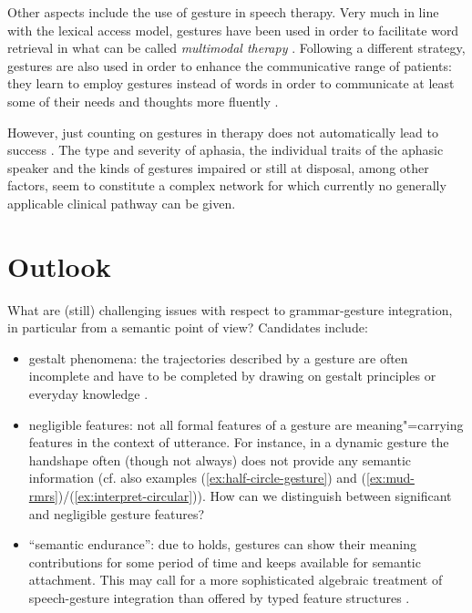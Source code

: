 \documentclass[output=paper
                ,modfonts
                ,nonflat
	        ,collection
	        ,collectionchapter
	        ,collectiontoclongg
 	        ,biblatex
                ,babelshorthands
                ,newtxmath
                ,draftmode
                ,colorlinks, citecolor=brown
]{./langsci/langscibook}
\begin{document}
Other aspects include the use of gesture in speech therapy. 
%
Very much in line with the lexical access model, gestures have been used in order to facilitate word retrieval in what can be called \emph{multimodal therapy}  \citep{Rose:2006}.
%
Following a different strategy, gestures are also used in order to enhance the communicative range of patients: they learn to employ gestures instead of words in order to communicate at least some of their needs and thoughts more fluently \citep{Cubelli:Trentini:Montagna:1991,Caute:et:al:2013}.

However, just counting on gestures in therapy does not automatically lead to success \citep{Auer:Bauer:2011}. 
%
The type and severity of aphasia, the individual traits of the aphasic speaker and the kinds of gestures impaired or still at disposal, among other factors, seem to constitute a complex network for which currently no generally applicable clinical pathway can be given.




\section{Outlook}
\label{sec:outlook}

What are (still) challenging issues with respect to grammar-gesture integration, in particular from a semantic point of view? Candidates include:

\begin{itemize}
\item gestalt phenomena: the trajectories described by a gesture are often incomplete and have to be completed by drawing on gestalt principles or everyday knowledge \citep{Luecking:2016}.
\item negligible features: not all formal features of a gesture are meaning"=carrying features in the context of utterance. For instance, in a dynamic gesture the handshape often (though not always) does not provide any semantic information (cf. also examples (\ref{ex:half-circle-gesture}) and (\ref{ex:mud-rmrs})/(\ref{ex:interpret-circular})). How can we distinguish between significant and negligible gesture features?
\item \enquote{semantic endurance}: due to holds, gestures can show their meaning contributions for some period of time and keeps available for semantic attachment. This may call for a more sophisticated algebraic treatment of speech-gesture integration than offered by typed feature structures \citep{Rieser:2015}.
\end{itemize}
\end{document}
